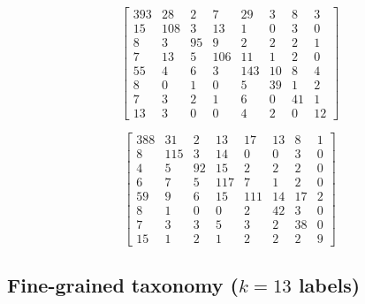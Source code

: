 \begin{table}[h]
\centering
\caption[Llama domain routing confusion matrix for $k=8$.]{Llama domain routing confusion matrix for $k=8$ (rows=true, cols=pred). Label order:
\texttt{[economy, health\_social, foreign\_security, law\_rights, politics\_government, environment\_energy, society\_culture, misc]}.}
\label{tab:domain_cm_llama_k8}
\small
\[
\begin{bmatrix}
393 & 28 & 2 & 7 & 29 & 3 & 8 & 3 \\
15 & 108 & 3 & 13 & 1 & 0 & 3 & 0 \\
8 & 3 & 95 & 9 & 2 & 2 & 2 & 1 \\
7 & 13 & 5 & 106 & 11 & 1 & 2 & 0 \\
55 & 4 & 6 & 3 & 143 & 10 & 8 & 4 \\
8 & 0 & 1 & 0 & 5 & 39 & 1 & 2 \\
7 & 3 & 2 & 1 & 6 & 0 & 41 & 1 \\
13 & 3 & 0 & 0 & 4 & 2 & 0 & 12
\end{bmatrix}
\]
\normalsize
\end{table}

\begin{table}[h]
\centering
\caption[Gemma domain routing confusion matrix for $k=8$.]{Gemma domain routing confusion matrix for $k=8$ (rows=true, cols=pred). Label order:
\texttt{[economy, health\_social, foreign\_security, law\_rights, politics\_government, environment\_energy, society\_culture, misc]}.}
\label{tab:domain_cm_gemma_k8}
\small
\[
\begin{bmatrix}
388 & 31 & 2 & 13 & 17 & 13 & 8 & 1 \\
8 & 115 & 3 & 14 & 0 & 0 & 3 & 0 \\
4 & 5 & 92 & 15 & 2 & 2 & 2 & 0 \\
6 & 7 & 5 & 117 & 7 & 1 & 2 & 0 \\
59 & 9 & 6 & 15 & 111 & 14 & 17 & 2 \\
8 & 1 & 0 & 0 & 2 & 42 & 3 & 0 \\
7 & 3 & 3 & 5 & 3 & 2 & 38 & 0 \\
15 & 1 & 2 & 1 & 2 & 2 & 2 & 9
\end{bmatrix}
\]
\normalsize
\end{table}

\FloatBarrier
\subsection{Fine-grained taxonomy ($k=13$ labels)}
\label{app:cm_k12}

